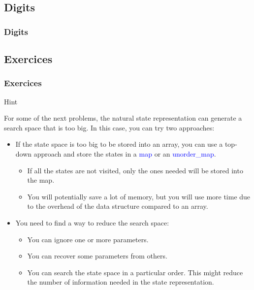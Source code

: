 \documentclass{beamer}
\newcommand{\hint}[1]{
\begin{bclogo}[arrondi=0.1, logo=\bclampe]{Hint}
#1
\end{bclogo}
}
\begin{document}
\subsection{Digits}

\begin{frame}%
\frametitle{Digits}

\end{frame}

\subsection{Exercices}

\begin{frame}%
\frametitle{Exercices}

\scriptsize

\hint{
For some of the next problems, the natural state representation can generate a search space that is too big.
In this case, you can try two approaches:
\begin{itemize}

\item If the state space is too big to be stored into an array, you can use a top-down approach and store the states in a \textcolor{blue}{map} or an
\textcolor{blue}{unorder\_map}.
\vspace{0.1cm}
\begin{itemize}
\scriptsize
\item<2-> If all the states are not visited, only the ones needed will be stored into the map.
\vspace{0.1cm}
\item<2-> You will potentially save a lot of memory, but you will use more time
due to the overhead of the data structure compared to an array.
\end{itemize}

\item<3-> You need to find a way to reduce the search space:
\begin{itemize}
\scriptsize
\item<3-> You can ignore one or more parameters.
\vspace{0.1cm}
\item<4-> You can recover some parameters from others.
\vspace{0.1cm}
\item<5-> You can search the state space in a particular order. This might reduce the number of information
needed in the state representation.
\vspace{0.1cm}

\end{itemize}

\end{itemize}
}

\end{frame}
\end{document}
